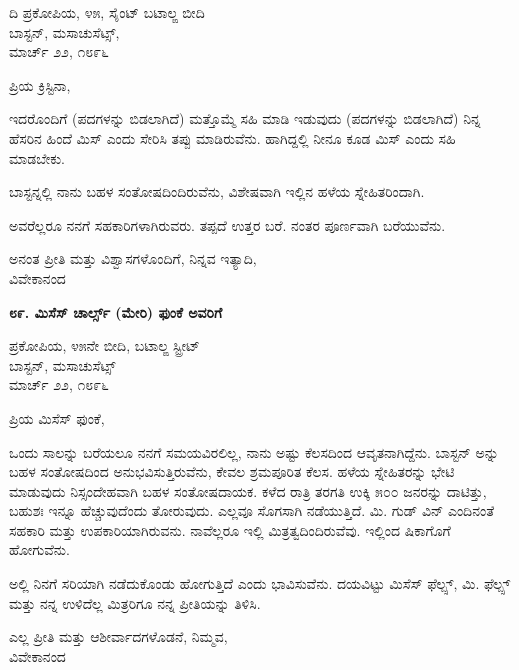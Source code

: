 \begin{flushright}
 ದಿ ಪ್ರಕೋಪಿಯ, ೪೫, ಸೈಂಟ್ ಬಟಾಲ್ಙ ಬೀದಿ\\ಬಾಸ್ಟನ್, ಮಸಾಚುಸೆಟ್ಸ್,\\ಮಾರ್ಚ್ ೨೨, ೧೮೯೬
\end{flushright}

ಪ್ರಿಯ ಕ್ರಿಸ್ಟಿನಾ,

ಇದರೊಂದಿಗೆ (ಪದಗಳನ್ನು ಬಿಡಲಾಗಿದೆ) ಮತ್ತೊಮ್ಮೆ ಸಹಿ ಮಾಡಿ ಇಡುವುದು (ಪದಗಳನ್ನು ಬಿಡಲಾಗಿದೆ) ನಿನ್ನ ಹೆಸರಿನ ಹಿಂದೆ ಮಿಸ್ ಎಂದು ಸೇರಿಸಿ ತಪ್ಪು ಮಾಡಿರುವೆನು. ಹಾಗಿದ್ದಲ್ಲಿ ನೀನೂ ಕೂಡ ಮಿಸ್ ಎಂದು ಸಹಿ ಮಾಡಬೇಕು.

ಬಾಸ್ಟನ್ನಲ್ಲಿ ನಾನು ಬಹಳ ಸಂತೋಷದಿಂದಿರುವೆನು, ವಿಶೇಷವಾಗಿ ಇಲ್ಲಿನ ಹಳೆಯ ಸ್ನೇಹಿತರಿಂದಾಗಿ.

ಅವರೆಲ್ಲರೂ ನನಗೆ ಸಹಕಾರಿಗಳಾಗಿರುವರು. ತಪ್ಪದೆ ಉತ್ತರ ಬರೆ. ನಂತರ ಪೂರ್ಣವಾಗಿ ಬರೆಯುವೆನು.

\begin{flushright}
ಅನಂತ ಪ್ರೀತಿ ಮತ್ತು ವಿಶ್ವಾಸಗಳೊಂದಿಗೆ, ನಿನ್ನವ ಇತ್ಯಾದಿ,\\ವಿವೇಕಾನಂದ
\end{flushright}

\begin{center}
\textbf{೮೯. ಮಿಸೆಸ್ ಚಾರ್ಲ್ಸ್ (ಮೇರಿ) ಫುಂಕೆ ಅವರಿಗೆ}
\end{center}

\begin{flushright}
 ಪ್ರಕೋಪಿಯ, ೪೫ನೇ ಬೀದಿ, ಬಟಾಲ್ಙ ಸ್ಟ್ರೀಟ್\\ಬಾಸ್ಟನ್, ಮಸಾಚುಸೆಟ್ಸ್\\ಮಾರ್ಚ್ ೨೨, ೧೮೯೬
\end{flushright}

ಪ್ರಿಯ ಮಿಸೆಸ್ ಫುಂಕೆ,

ಒಂದು ಸಾಲನ್ನು ಬರೆಯಲೂ ನನಗೆ ಸಮಯವಿರಲಿಲ್ಲ, ನಾನು ಅಷ್ಟು ಕೆಲಸದಿಂದ ಆವೃತನಾಗಿದ್ದೆನು. ಬಾಸ್ಟನ್ ಅನ್ನು ಬಹಳ ಸಂತೋಷದಿಂದ ಅನುಭವಿಸುತ್ತಿರುವೆನು, ಕೇವಲ ಶ್ರಮಪೂರಿತ ಕೆಲಸ. ಹಳೆಯ ಸ್ನೇಹಿತರನ್ನು ಭೇಟಿ ಮಾಡುವುದು ನಿಸ್ಸಂದೇಹವಾಗಿ ಬಹಳ ಸಂತೋಷದಾಯಕ. ಕಳೆದ ರಾತ್ರಿ ತರಗತಿ ಉಕ್ಕಿ ೫೦೦ ಜನರನ್ನು ದಾಟಿತ್ತು, ಬಹುಶಃ ಇನ್ನೂ ಹೆಚ್ಚುವುದೆಂದು ತೋರುವುದು. ಎಲ್ಲವೂ ಸೊಗಸಾಗಿ ನಡೆಯುತ್ತಿದೆ. ಮಿ. ಗುಡ್ ವಿನ್ ಎಂದಿನಂತೆ ಸಹಕಾರಿ ಮತ್ತು ಉಪಕಾರಿಯಾಗಿರುವನು. ನಾವೆಲ್ಲರೂ ಇಲ್ಲಿ ಮಿತ್ರತ್ವದಿಂದಿರುವೆವು. ಇಲ್ಲಿಂದ ಷಿಕಾಗೊಗೆ ಹೋಗುವೆನು.

ಅಲ್ಲಿ ನಿನಗೆ ಸರಿಯಾಗಿ ನಡೆದುಕೊಂಡು ಹೋಗುತ್ತಿದೆ ಎಂದು ಭಾವಿಸುವೆನು. ದಯವಿಟ್ಟು ಮಿಸೆಸ್ ಫೆಲ್ಪ್ಸ್, ಮಿ. ಫೆಲ್ಪ್ಸ್ ಮತ್ತು ನನ್ನ ಉಳಿದೆಲ್ಲ ಮಿತ್ರರಿಗೂ ನನ್ನ ಪ್ರೀತಿಯನ್ನು ತಿಳಿಸಿ.

\begin{flushright}
ಎಲ್ಲ ಪ್ರೀತಿ ಮತ್ತು ಆಶೀರ್ವಾದಗಳೊಡನೆ, ನಿಮ್ಮವ,\\ವಿವೇಕಾನಂದ
\end{flushright}

